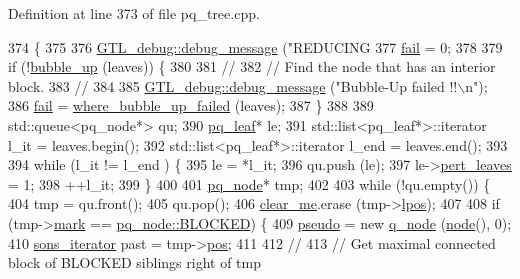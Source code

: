 Definition at line 373 of file pq\+\_\+tree.\+cpp.


\begin{DoxyCode}
374 \{   
375 
376     \mbox{\hyperlink{class_g_t_l__debug_aca4c2fb24203b5fba5e4ffa9c2fa263f}{GTL\_debug::debug\_message}} (\textcolor{stringliteral}{"REDUCING %
377     \mbox{\hyperlink{classpq__tree_a4e0a0e6d74a8ac062acf3a05723a35f2}{fail}} = 0;
378     
379     \textcolor{keywordflow}{if} (!\mbox{\hyperlink{classpq__tree_a109cb910dcb75d3e196a46f5174406c7}{bubble\_up}} (leaves)) \{
380 
381     \textcolor{comment}{//}
382     \textcolor{comment}{// Find the node that has an interior block. }
383     \textcolor{comment}{//}
384 
385     \mbox{\hyperlink{class_g_t_l__debug_aca4c2fb24203b5fba5e4ffa9c2fa263f}{GTL\_debug::debug\_message}} (\textcolor{stringliteral}{"Bubble-Up failed !!\(\backslash\)n"});
386     \mbox{\hyperlink{classpq__tree_a4e0a0e6d74a8ac062acf3a05723a35f2}{fail}} = \mbox{\hyperlink{classpq__tree_a5b394c87bfa938f388b847f0040c2940}{where\_bubble\_up\_failed}} (leaves);
387     \}
388     
389     std::queue<pq\_node*> qu;
390     \mbox{\hyperlink{classpq__leaf}{pq\_leaf}}* le;
391     std::list<pq\_leaf*>::iterator l\_it = leaves.begin();
392     std::list<pq\_leaf*>::iterator l\_end = leaves.end();
393     
394     \textcolor{keywordflow}{while} (l\_it != l\_end ) \{
395     le = *l\_it;
396     qu.push (le);
397     le->\mbox{\hyperlink{classpq__node_a3fb78609f93f41efd6826ed3169fc312}{pert\_leaves}} = 1;
398     ++l\_it;
399     \}
400     
401     \mbox{\hyperlink{classpq__node}{pq\_node}}* tmp;
402 
403     \textcolor{keywordflow}{while} (!qu.empty()) \{
404     tmp = qu.front();
405     qu.pop();
406     \mbox{\hyperlink{classpq__tree_a43bcdb58d91b7e20860f523f49c74fd1}{clear\_me}}.erase (tmp->\mbox{\hyperlink{classpq__node_a71cc9bb3c11aac468ff77d64643c38dc}{lpos}});
407 
408     \textcolor{keywordflow}{if} (tmp->\mbox{\hyperlink{classpq__node_aee913582a7b268ce2570bee8a8367c50}{mark}} == \mbox{\hyperlink{classpq__node_a6236b20cd5f6cc02cb5f637ed34c96d9a70312622ded9f04f068838ec195fc53c}{pq\_node::BLOCKED}}) \{
409         \mbox{\hyperlink{classpq__tree_a036ce0ebe9f5129d5c4ad930bbcc3e6f}{pseudo}} = \textcolor{keyword}{new} \mbox{\hyperlink{classq__node}{q\_node}} (\mbox{\hyperlink{classnode}{node}}(), 0);        
410         \mbox{\hyperlink{classpq__tree_ab47263066d4b0acc70e00043870d748a}{sons\_iterator}} past = tmp->\mbox{\hyperlink{classpq__node_a5e8a5defa0fec4ff2e82fabee97296b4}{pos}};
411             
412         \textcolor{comment}{//}
413         \textcolor{comment}{// Get maximal connected block of BLOCKED siblings right of tmp}
}
\end{DoxyCode}
